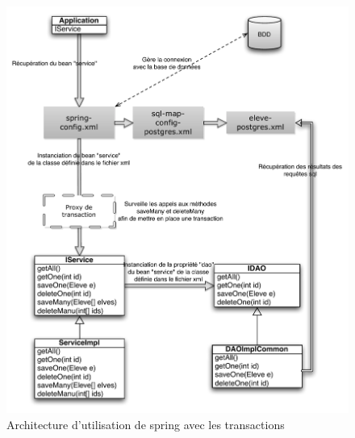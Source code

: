 \documentclass[a4paper,12pt]{article}
\begin{document}
\begin{figure}[H]
	\center
	\includegraphics[width=15cm]{img/springibatistransac.pdf}
	\caption{Architecture d'utilisation de spring avec les transactions}
\end{figure}
\end{document}
